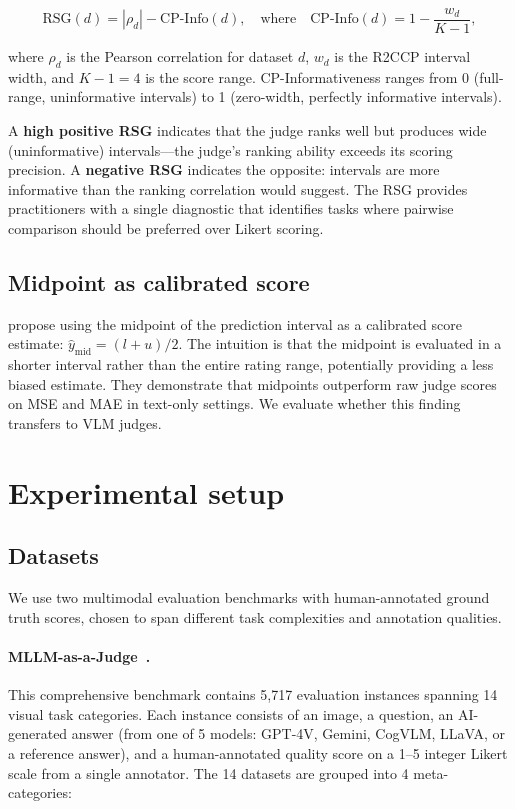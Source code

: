 \documentclass{article}
\begin{document}
\begin{equation}
\text{RSG}(d) = |\rho_d| - \text{CP-Info}(d), \quad \text{where} \quad \text{CP-Info}(d) = 1 - \frac{w_d}{K - 1},
\label{eq:rsg}
\end{equation}

where $\rho_d$ is the Pearson correlation for dataset $d$, $w_d$ is the R2CCP interval width, and $K - 1 = 4$ is the score range. CP-Informativeness ranges from 0 (full-range, uninformative intervals) to 1 (zero-width, perfectly informative intervals).

A \textbf{high positive RSG} indicates that the judge ranks well but produces wide (uninformative) intervals---the judge's ranking ability exceeds its scoring precision. A \textbf{negative RSG} indicates the opposite: intervals are more informative than the ranking correlation would suggest. The RSG provides practitioners with a single diagnostic that identifies tasks where pairwise comparison should be preferred over Likert scoring.

\subsection{Midpoint as calibrated score}
\label{sec:midpoint_background}

\citet{sheng2025analyzing} propose using the midpoint of the prediction interval as a calibrated score estimate: $\hat{y}_\text{mid} = (l + u) / 2$. The intuition is that the midpoint is evaluated in a shorter interval rather than the entire rating range, potentially providing a less biased estimate. They demonstrate that midpoints outperform raw judge scores on MSE and MAE in text-only settings. We evaluate whether this finding transfers to VLM judges.

\section{Experimental setup}
\label{sec:setup}

\subsection{Datasets}
\label{sec:datasets}

We use two multimodal evaluation benchmarks with human-annotated ground truth scores, chosen to span different task complexities and annotation qualities.

\paragraph{MLLM-as-a-Judge~\citep{chen2024mllmasajudge}.} This comprehensive benchmark contains 5,717 evaluation instances spanning 14 visual task categories. Each instance consists of an image, a question, an AI-generated answer (from one of 5 models: GPT-4V, Gemini, CogVLM, LLaVA, or a reference answer), and a human-annotated quality score on a 1--5 integer Likert scale from a single annotator. The 14 datasets are grouped into 4 meta-categories:
\end{document}
